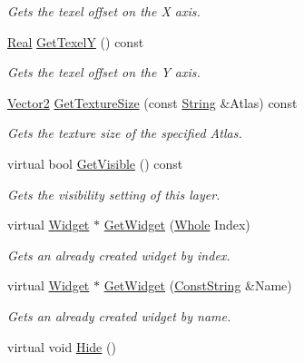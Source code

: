\begin{DoxyCompactItemize}
\begin{DoxyCompactList}\small\item\em Gets the texel offset on the X axis. \item\end{DoxyCompactList}\item 
\hyperlink{namespaceMezzanine_a726731b1a7df72bf3583e4a97282c6f6}{Real} \hyperlink{classMezzanine_1_1UI_1_1Layer_a7931c62c5a8ace67f81e8203a42419a7}{GetTexelY} () const 
\begin{DoxyCompactList}\small\item\em Gets the texel offset on the Y axis. \item\end{DoxyCompactList}\item 
\hyperlink{classMezzanine_1_1Vector2}{Vector2} \hyperlink{classMezzanine_1_1UI_1_1Layer_aaac98bc9aa24a4ab03b045018b3deeba}{GetTextureSize} (const \hyperlink{namespaceMezzanine_acf9fcc130e6ebf08e3d8491aebcf1c86}{String} \&Atlas) const 
\begin{DoxyCompactList}\small\item\em Gets the texture size of the specified Atlas. \item\end{DoxyCompactList}\item 
virtual bool \hyperlink{classMezzanine_1_1UI_1_1Layer_a172eccc6e183ac05d1cff453de757a0f}{GetVisible} () const 
\begin{DoxyCompactList}\small\item\em Gets the visibility setting of this layer. \item\end{DoxyCompactList}\item 
virtual \hyperlink{classMezzanine_1_1UI_1_1Widget}{Widget} $\ast$ \hyperlink{classMezzanine_1_1UI_1_1Layer_a253eb9e18e213c2f1f9b3a9831e06a95}{GetWidget} (\hyperlink{namespaceMezzanine_adcbb6ce6d1eb4379d109e51171e2e493}{Whole} Index)
\begin{DoxyCompactList}\small\item\em Gets an already created widget by index. \item\end{DoxyCompactList}\item 
virtual \hyperlink{classMezzanine_1_1UI_1_1Widget}{Widget} $\ast$ \hyperlink{classMezzanine_1_1UI_1_1Layer_a2d0ad533ccb60047f5cd0d24f2e7e377}{GetWidget} (\hyperlink{namespaceMezzanine_a63cd699ac54b73953f35ec9cfc05e506}{ConstString} \&Name)
\begin{DoxyCompactList}\small\item\em Gets an already created widget by name. \item\end{DoxyCompactList}\item 
\hypertarget{classMezzanine_1_1UI_1_1Layer_ada49384da792711c08d75736acc720f5}{
virtual void \hyperlink{classMezzanine_1_1UI_1_1Layer_ada49384da792711c08d75736acc720f5}{Hide} ()}
\label{classMezzanine_1_1UI_1_1Layer_ada49384da792711c08d75736acc720f5}


\end{DoxyCompactItemize}
